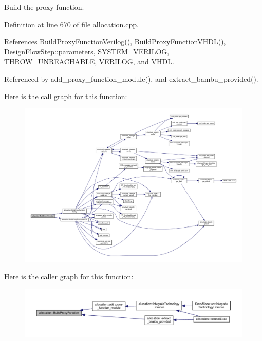 Build the proxy function. 



Definition at line 670 of file allocation.\+cpp.



References Build\+Proxy\+Function\+Verilog(), Build\+Proxy\+Function\+V\+H\+D\+L(), Design\+Flow\+Step\+::parameters, S\+Y\+S\+T\+E\+M\+\_\+\+V\+E\+R\+I\+L\+OG, T\+H\+R\+O\+W\+\_\+\+U\+N\+R\+E\+A\+C\+H\+A\+B\+LE, V\+E\+R\+I\+L\+OG, and V\+H\+DL.



Referenced by add\+\_\+proxy\+\_\+function\+\_\+module(), and extract\+\_\+bambu\+\_\+provided().

Here is the call graph for this function\+:
\nopagebreak
\begin{figure}[H]
\begin{center}
\leavevmode
\includegraphics[width=350pt]{d0/d74/classallocation_a7e6e103d4874dd3126414e0f4d8bdd24_cgraph}
\end{center}
\end{figure}
Here is the caller graph for this function\+:
\nopagebreak
\begin{figure}[H]
\begin{center}
\leavevmode
\includegraphics[width=350pt]{d0/d74/classallocation_a7e6e103d4874dd3126414e0f4d8bdd24_icgraph}
\end{center}
\end{figure}
\mbox{\label{classallocation_ac305b0fc0edfc7c02e39b37a5615260f}} 
